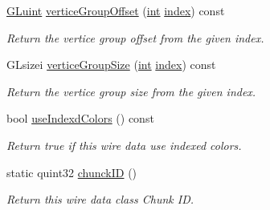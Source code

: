 \begin{DoxyCompactItemize}
\hyperlink{glext_8h_a2f0c8cd5c21f9fcbd931c3f48bc90dfc}{G\-Luint} \hyperlink{class_g_l_c___wire_data_a95e5a73659d201f6df02293aadff2150}{vertice\-Group\-Offset} (\hyperlink{ioapi_8h_a787fa3cf048117ba7123753c1e74fcd6}{int} \hyperlink{glext_8h_ab47dd9958bcadea08866b42bf358e95e}{index}) const 
\begin{DoxyCompactList}\small\item\em Return the vertice group offset from the given index. \end{DoxyCompactList}\item 
G\-Lsizei \hyperlink{class_g_l_c___wire_data_aa9ea64c970082dd92001fba36202f18e}{vertice\-Group\-Size} (\hyperlink{ioapi_8h_a787fa3cf048117ba7123753c1e74fcd6}{int} \hyperlink{glext_8h_ab47dd9958bcadea08866b42bf358e95e}{index}) const 
\begin{DoxyCompactList}\small\item\em Return the vertice group size from the given index. \end{DoxyCompactList}\item 
bool \hyperlink{class_g_l_c___wire_data_a3ca24e8e1bc362515c2c67a1fa4ec63c}{use\-Indexd\-Colors} () const 
\begin{DoxyCompactList}\small\item\em Return true if this wire data use indexed colors. \end{DoxyCompactList}\item 
static quint32 \hyperlink{class_g_l_c___wire_data_ab0475d90b9633f09e4b4fc62d52d8836}{chunck\-I\-D} ()
\begin{DoxyCompactList}\small\item\em Return this wire data class Chunk I\-D. \end{DoxyCompactList}\end{DoxyCompactItemize}
